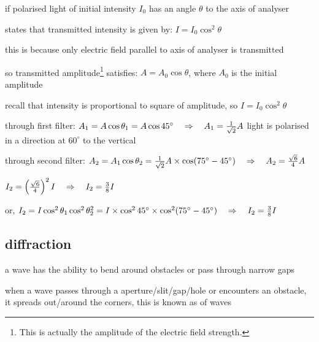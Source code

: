 \cmt if polarised light of initial intensity $I_0$ has an angle $\theta$ to the axis of analyser

 states that transmitted intensity is given by: ${I = I_0 \cos^2 \theta}$

this is because only electric field parallel to axis of analyser is transmitted

so transmitted amplitude\footnote{This is actually the amplitude of the electric field strength.} satisfies: $A = A_0 \cos\theta$, where $A_0$ is the initial amplitude

recall that intensity is proportional to square of amplitude, so $I = I_0 \cos^2 \theta $


\begin{soln} through first filter: 
$A_1 = A \cos\theta_1 = A \cos 45^\circ \quad \Rightarrow \quad A_1 = \frac{1}{\sqrt{2}} A $
light is polarised in a direction at $60^\circ$ to the vertical

through second filter:
$A_2 = A_1 \cos\theta_2 = \frac{1}{\sqrt{2}} A \times \cos (75^\circ - 45^\circ) \quad \Rightarrow \quad A_2 = \frac{\sqrt{6}}{4} A $

$I_2 = \left(\frac{\sqrt{6}}{4} \right)^2 I \quad \Rightarrow \quad I_2 = \frac{3}{8} I$

 or, $I_2 = I \cos^2\theta_1 \cos^2 \theta_2^2 = I \times \cos^2 45^\circ \times \cos^2 (75^\circ-45^\circ) \quad \Rightarrow \quad I_2 = \frac{3}{8} I$ 

\end{soln}





\subsection{diffraction}

a wave has the ability to bend around obstacles or pass through narrow gaps

\begin{ilight}
	when a wave passes through a aperture/slit/gap/hole or encounters an obstacle, it spreads out/around the corners, this is known as  of waves
\end{ilight}

